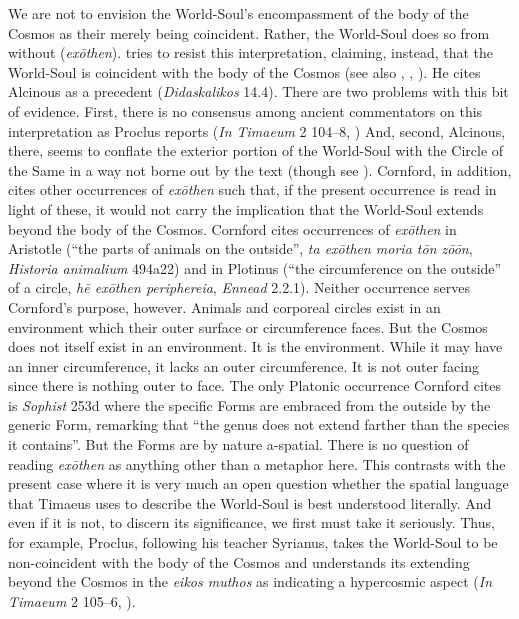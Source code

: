 We are not to envision the World-Soul's encompassment of the body of the Cosmos as their merely being coincident. Rather, the World-Soul does so from without (\emph{exōthen}). \citet[58]{Cornford:1935fk} tries to resist this interpretation, claiming, instead, that the World-Soul is coincident with the body of the Cosmos (see also \citealt[105]{Taylor:1928qb}, \citealt[85]{Skemp:1942oc}, \citealt[70]{Robinson:1970lq}). He cites Alcinous as a precedent (\emph{Didaska\-likos} 14.4). There are two problems with this bit of evidence. First, there is no consensus among ancient commentators on this interpretation as Proclus reports (\emph{In Timaeum} 2 104--8, \citealt{Diehl:1903re}) And, second, Alcinous, there, seems to conflate the exterior portion of the World-Soul with the Circle of the Same in a way not borne out by the text (though see \citealt[105]{Taylor:1928qb}). Cornford, in addition, cites other occurrences of \emph{exōthen} such that, if the present occurrence is read in light of these, it would not carry the implication that the World-Soul extends beyond the body of the Cosmos. Cornford cites occurrences of \emph{exōthen} in Aristotle (``the parts of animals on the outside'', \emph{ta exōthen moria tōn zōōn}, \emph{Historia animalium} 494a22) and in Plotinus (``the circumference on the outside'' of a circle, \emph{hē exōthen periphereia}, \emph{Ennead} 2.2.1). Neither occurrence serves Cornford's purpose, however. Animals and corporeal circles exist in an environment which their outer surface or circumference faces. But the Cosmos does not itself exist in an environment. It is the environment. While it may have an inner circumference, it lacks an outer circumference. It is not outer facing since there is nothing outer to face. The only Platonic occurrence Cornford cites is \emph{Sophist} 253d where the specific Forms are embraced from the outside by the generic Form, remarking that ``the genus does not extend farther than the species it contains''. But the Forms are by nature a-spatial. There is no question of reading \emph{exōthen} as anything other than a metaphor here. This contrasts with the present case where it is very much an open question whether the spatial language that Timaeus uses to describe the World-Soul is best understood literally. And even if it is not, to discern its significance, we first must take it seriously. Thus, for example, Proclus, following his teacher Syrianus, takes the World-Soul to be non-coincident with the body of the Cosmos and understands its extending beyond the Cosmos in the \emph{eikos muthos} as indicating a hypercosmic aspect (\emph{In Timaeum} 2 105--6, \citealt{Diehl:1903re}).

